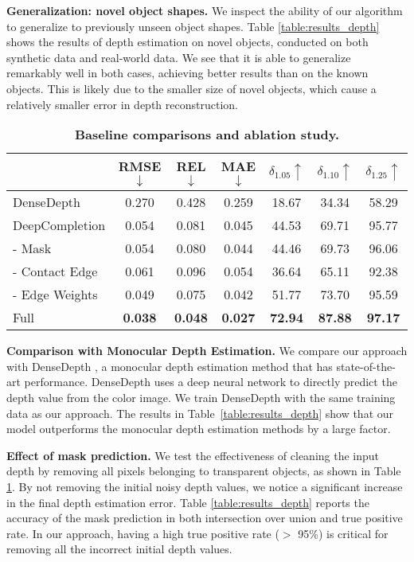 \documentclass[letterpaper, 10 pt, conference]{ieeeconf}
\newcommand{\tabref}[1]{Table~\ref{#1}}
\newcommand{\myparagraph}[1]{\vspace{0.03in}\noindent\textbf{#1}}
\begin{document}
\myparagraph{Generalization: novel object shapes.}
We inspect the ability of our algorithm to generalize to previously unseen object shapes. Table \ref{table:results_depth} shows the results of depth estimation on novel objects, conducted on both synthetic data and real-world data. We see that it is able to generalize remarkably well in both cases, achieving better results than on the known objects. This is likely due to the smaller size of novel objects, which cause a relatively smaller error in depth reconstruction.

\begin{table}[ht]
\setlength{}
\centering
\caption{\textbf{Baseline comparisons and ablation study.}}
\vspace{-2mm}
\begin{tabular}{l|cccccc}
\toprule
& RMSE$\downarrow$ & REL$\downarrow$ & MAE$\downarrow$  & $\delta_{1.05}\uparrow$ & $\delta_{1.10}\uparrow$ & $\delta_{1.25}\uparrow$ \\
\midrule
DenseDepth \cite{Alhashim2018densedepth} & 0.270 & 0.428 & 0.259 & 18.67 & 34.34 & 58.29 \\
DeepCompletion \cite{zhang2018deepdepth} & 0.054 & 0.081 & 0.045 & 44.53 & 69.71 & 95.77 \\
\midrule
- Mask          & 0.054 & 0.080 & 0.044 & 44.46 & 69.73 & 96.06 \\
- Contact Edge  & 0.061 & 0.096 & 0.054 & 36.64 & 65.11 & 92.38 \\
- Edge Weights  & 0.049 & 0.075 & 0.042 & 51.77 & 73.70 & 95.59 \\
Full            & \textbf{0.038 }& \textbf{0.048} & \textbf{0.027} & \textbf{72.94} & \textbf{87.88} &\textbf{97.17} \\
\bottomrule
\end{tabular}
\vspace{-5mm}
\label{table:ablation}
\end{table}

\myparagraph{Comparison with Monocular Depth Estimation.}
We compare our approach with DenseDepth \cite{Alhashim2018densedepth}, a monocular depth estimation method that has state-of-the-art performance. DenseDepth uses a deep neural network to directly predict the depth value from the color image. We train DenseDepth with the same training data as our approach.
The results in \tabref{table:results_depth} show that our model outperforms the monocular depth estimation methods by a large factor.

\myparagraph{Effect of mask prediction.}
We test the effectiveness of cleaning the input depth by removing all pixels belonging to transparent objects, as shown in Table \ref{table:ablation}. By not removing the initial noisy  depth values, we notice a significant increase in the final depth estimation error. 
Table \ref{table:results_depth} reports the accuracy of the mask prediction in both intersection over union and true positive rate. In our approach, having a high true positive rate ($>$ 95\%) is critical for removing all the incorrect initial depth values.  
\end{document}
